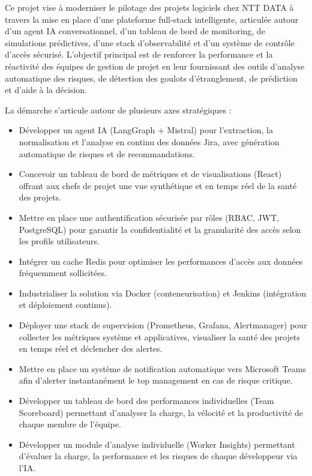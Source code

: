 Ce projet vise à moderniser le pilotage des projets logiciels chez NTT DATA à travers la mise en place d’une plateforme full‑stack intelligente, articulée autour d’un agent IA conversationnel, d’un tableau de bord de monitoring, de simulations prédictives, d’une stack d’observabilité et d’un système de contrôle d’accès sécurisé. L’objectif principal est de renforcer la performance et la réactivité des équipes de gestion de projet en leur fournissant des outils d’analyse automatique des risques, de détection des goulots d’étranglement, de prédiction et d’aide à la décision.

La démarche s’articule autour de plusieurs axes stratégiques :

\begin{itemize}
    \renewcommand{\labelitemi}{—}
    \item Développer un agent IA (LangGraph + Mistral) pour l’extraction, la normalisation et l’analyse en continu des données Jira, avec génération automatique de risques et de recommandations.
    \item Concevoir un tableau de bord de métriques et de visualisations (React) offrant aux chefs de projet une vue synthétique et en temps réel de la santé des projets.
    \item Mettre en place une authentification sécurisée par rôles (RBAC, JWT, PostgreSQL) pour garantir la confidentialité et la granularité des accès selon les profils utilisateurs.
    \item Intégrer un cache Redis pour optimiser les performances d’accès aux données fréquemment sollicitées.
    \item Industrialiser la solution via Docker (conteneurisation) et Jenkins (intégration et déploiement continus).
    \item Déployer une stack de supervision (Prometheus, Grafana, Alertmanager) pour collecter les métriques système et applicatives, visualiser la santé des projets en temps réel et déclencher des alertes.
    \item Mettre en place un système de notification automatique vers Microsoft Teams afin d’alerter instantanément le top management en cas de risque critique.
    \item Développer un tableau de bord des performances individuelles (Team Scoreboard) permettant d’analyser la charge, la vélocité et la productivité de chaque membre de l’équipe.
    \item Développer un module d’analyse individuelle (Worker Insights) permettant d’évaluer la charge, la performance et les risques de chaque développeur via l’IA.
\end{itemize}

